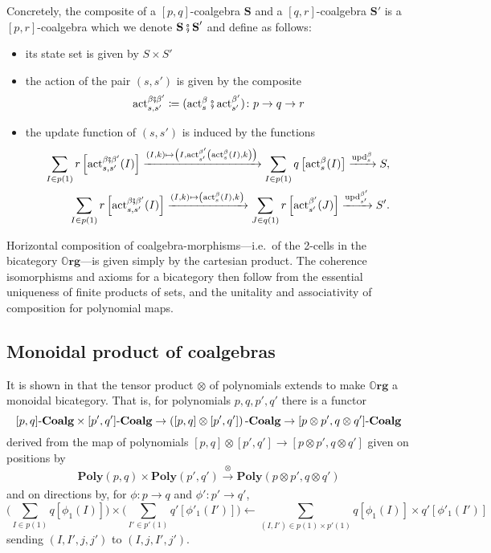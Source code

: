 \documentclass{eptcs}
\theoremstyle{definition}
\theoremstyle{plain}
\newcommand{\Cat}[1]{\textbf{#1}}%
\newcommand{\then}{\mathbin{\fatsemi}}
\newcommand{\To}[2][]{\xrightarrow[#1]{#2}}
\newcommand{\fromm}{\longleftarrow}
\newcommand{\tn}[1]{\textnormal{#1}}
\newcommand{\act}{\tn{act}}
\newcommand{\upd}{\tn{upd}}
\newcommand{\poly}{\Cat{Poly}}
\newcommand{\0}{\textsf{0}}
\newcommand{\1}{\tn{\textsf{1}}}
\newcommand{\coalg}{\tn{-}\Cat{Coalg}}
\newcommand{\org}{{\mathbb{O}\Cat{rg}}}
\renewcommand{\S}{{\Cat{S}}}
\begin{document}
Concretely, the composite of a $[p,q]$-coalgebra $\S$ and a $[q,r]$-coalgebra $\S'$ is a $[p,r]$-coalgebra which we denote $\S\then\S'$  and define as follows:
\begin{itemize}
	\item its state set is given by $S \times S'$
	\item the action of the pair $(s,s')$ is given by the composite 
\[\act^{\beta\then\beta'}_{s,s'}\coloneqq(\act^\beta_s\then\act^{\beta'}_{s'})\colon p \to q \to r\]
	\item the update function of $(s,s')$ is induced by the functions
\begin{align*}
	\sum_{I \in p(1)} r\left[\act^{\beta\then\beta'}_{s,s'}(I)\right] \To{(I,k)\mapsto\left(I,\act^{\beta'}_{s'}\left(\act^\beta_s(I),k\right)\right)} \sum_{I \in p(1)} q\left[\act^\beta_s(I)\right] \To{\upd^\beta_s} S,\\
	\sum_{I \in p(1)} r\left[\act^{\beta\then\beta'}_{s,s'}(I)\right] \To{(I,k)\mapsto\left(\act^\beta_s(I),k\right)} \sum_{J \in q(1)} r\left[\act^{\beta'}_{s'}(J)\right] \To{\upd^{\beta'}_{s'}} S'.
\end{align*}
\end{itemize}

Horizontal composition of coalgebra-morphisms---i.e.\ of the 2-cells in the bicategory $\org$---is given simply by the cartesian product. The coherence isomorphisms and axioms for a bicategory then follow from the essential uniqueness of finite products of sets, and the unitality and associativity of composition for polynomial maps.%



\subsection{Monoidal product of coalgebras}


It is shown in \cite[Proposition 2.13]{spivak2021learners} that the tensor product $\otimes$ of polynomials extends to make $\org$ a monoidal bicategory. That is, for polynomials $p,q,p',q'$ there is a functor
\[[p,q]\coalg \times [p',q']\coalg \to \left([p,q] \otimes [p',q']\right)\coalg \to [p \otimes p',q \otimes q']\coalg\]
derived from the map of polynomials $[p,q] \otimes [p',q'] \to [p {\otimes} p',q {\otimes} q']$ given on positions by 
\[\poly(p,q) \times \poly(p',q') \To{\otimes} \poly(p \otimes p',q \otimes q')\]
and on directions by, for $\phi\colon p \to q$ and $\phi'\colon p' \to q'$,
\[\bigg(\sum_{I \in p(1)} q[\phi_1(I)]\bigg) \times \bigg(\sum_{I' \in p'(1)} q'[\phi'_1(I')]\bigg) \fromm \sum_{(I,I') \in p(1) \times p'(1)} q[\phi_1(I)] \times q'[\phi'_1(I')]\]
sending $(I,I',j,j')$ to $(I,j,I',j')$.
\end{document}
